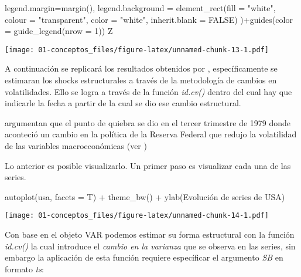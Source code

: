 \documentclass[
]{book}
\newenvironment{Shaded}{\begin{snugshade}}{\end{snugshade}}
\newcommand{\AttributeTok}[1]{\textcolor[rgb]{0.77,0.63,0.00}{#1}}
\newcommand{\ConstantTok}[1]{\textcolor[rgb]{0.00,0.00,0.00}{#1}}
\newcommand{\DecValTok}[1]{\textcolor[rgb]{0.00,0.00,0.81}{#1}}
\newcommand{\FunctionTok}[1]{\textcolor[rgb]{0.00,0.00,0.00}{#1}}
\newcommand{\NormalTok}[1]{#1}
\newcommand{\SpecialCharTok}[1]{\textcolor[rgb]{0.00,0.00,0.00}{#1}}
\newcommand{\StringTok}[1]{\textcolor[rgb]{0.31,0.60,0.02}{#1}}
\begin{document}
\begin{Shaded}
\begin{Highlighting}[]
  \AttributeTok{legend.margin=}\FunctionTok{margin}\NormalTok{(),}
  \AttributeTok{legend.background =} \FunctionTok{element\_rect}\NormalTok{(}\AttributeTok{fill =} \StringTok{"white"}\NormalTok{, }\AttributeTok{colour =} \StringTok{"transparent"}\NormalTok{,}
                                   \AttributeTok{color =} \StringTok{"white"}\NormalTok{, }\AttributeTok{inherit.blank =} \ConstantTok{FALSE}\NormalTok{)}
\NormalTok{)}\SpecialCharTok{+}\FunctionTok{guides}\NormalTok{(}\AttributeTok{color =} \FunctionTok{guide\_legend}\NormalTok{(}\AttributeTok{nrow =} \DecValTok{1}\NormalTok{))}
\NormalTok{Z}
\end{Highlighting}
\end{Shaded}

\texttt{[image: 01-conceptos\_files/figure-latex/unnamed-chunk-13-1.pdf]}

A continuación se replicará los resultados obtenidos por \citet{Herwartz2016}, específicamente se estimaran los shocks estructurales a través de la metodología de cambios en volatilidades. Ello se logra a través de la función \emph{id.cv()} dentro del cual hay que indicarle la fecha a partir de la cual se dio ese cambio estructural.

\citet{Herwartz2016} argumentan que el punto de quiebra se dio en el tercer trimestre de 1979 donde aconteció un cambio en la política de la Reserva Federal que redujo la volatilidad de las variables macroeconómicas (ver \citet{Stock2003})

Lo anterior es posible visualizarlo.
Un primer paso es visualizar cada una de las series.

\begin{Shaded}
\begin{Highlighting}[]
\FunctionTok{autoplot}\NormalTok{(usa, }\AttributeTok{facets =}\NormalTok{ T) }\SpecialCharTok{+} \FunctionTok{theme\_bw}\NormalTok{() }\SpecialCharTok{+} \FunctionTok{ylab}\NormalTok{(}\StringTok{\textquotesingle{}Evolución de series de USA\textquotesingle{}}\NormalTok{)}
\end{Highlighting}
\end{Shaded}

\texttt{[image: 01-conceptos\_files/figure-latex/unnamed-chunk-14-1.pdf]}

Con base en el objeto VAR podemos estimar su forma estructural con la función \emph{id.cv()} la cual introduce el \emph{cambio en la varianza} que se observa en las series, sin embargo la aplicación de esta función requiere específicar el argumento \emph{SB} en formato \emph{ts}:
\end{document}
